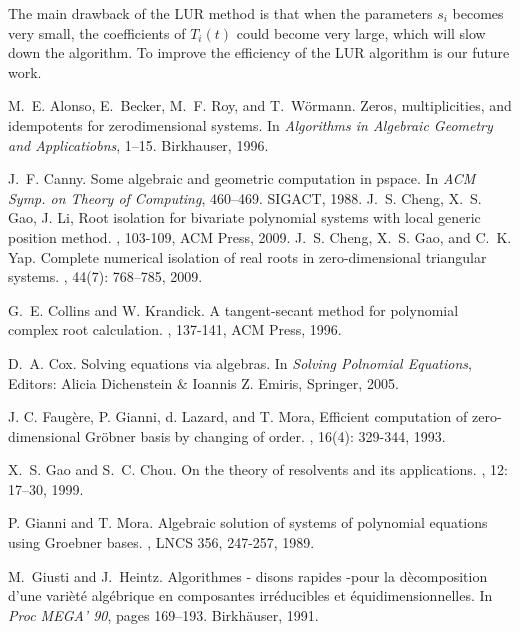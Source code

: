 \documentclass[amsthm]{JSC_LaTex_2007_Mar_12/elsart}
\begin{document}
The main drawback of the LUR method is that when the parameters
$s_i$ becomes very small, the coefficients of $T_i(t)$ could become
very large, which will slow down the algorithm. To improve the
efficiency of the LUR algorithm is our future work.


\begin{thebibliography}{99}
M.~E. Alonso, E.~Becker, M.~F. Roy, and T.~W{\"{o}}rmann.
\newblock Zeros, multiplicities, and idempotents for zerodimensional systems.
\newblock In {\em Algorithms in Algebraic Geometry and Applicatiobns},
  1--15. Birkhauser, 1996.


J.~F. Canny.
\newblock Some algebraic and geometric computation in pspace.
\newblock In {\em ACM Symp. on Theory of Computing}, 460--469. SIGACT,
  1988.
J.~S. Cheng, X.~S. Gao, J. Li,
\newblock Root isolation for bivariate polynomial
systems with local generic position method.
,
103-109, ACM Press, 2009.
J.~S. Cheng, X.~S. Gao, and C.~K. Yap.
\newblock Complete numerical isolation of real roots in zero-dimensional
  triangular systems.
, 44(7): 768--785, 2009.

G.~E. Collins and W. Krandick.
\newblock A tangent-secant method for
polynomial complex root calculation.
,
137-141, ACM Press, 1996.

D.~A. Cox.
\newblock Solving equations via algebras.
\newblock In {\em Solving Polnomial Equations}, Editors: Alicia Dichenstein $\&$ Ioannis Z. Emiris, Springer, 2005.

 J. C. Faug\`{e}re, P. Gianni, d. Lazard, and T. Mora,
\newblock Efficient computation of zero-dimensional Gr\"{o}bner basis by
changing of order.
, 16(4): 329-344, 1993.

X.~S. Gao and S.~C. Chou.
\newblock On the theory of resolvents and its applications.
, 12: 17--30, 1999.


P. Gianni and T. Mora.
 \newblock Algebraic solution of systems of polynomial equations using Groebner bases.
 , LNCS 356, 247-257, 1989.



M.~Giusti and J.~Heintz.
\newblock Algorithmes - disons rapides -pour la d\`ecomposition d'une
  vari\`et\'e alg\'ebrique en composantes irr\'educibles et
  \'equidimensionnelles.
\newblock In {\em Proc MEGA' 90}, pages 169--193. Birkh{\"a}user, 1991.


\end{thebibliography}
\end{document}
